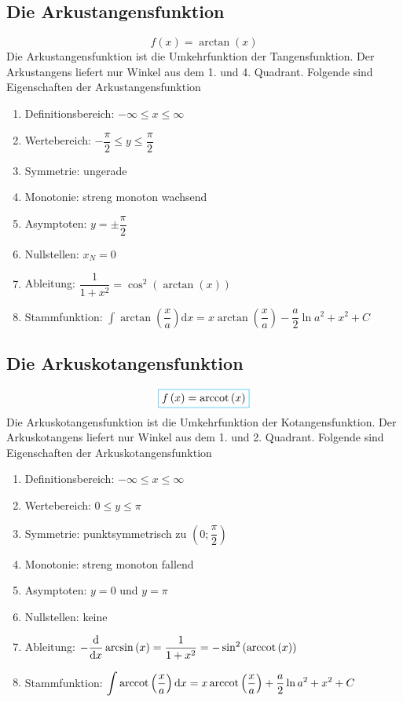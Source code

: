 \subsection{Die Arkustangensfunktion}
\begin{equation}
\boxed{f\left(x\right)=\arctan\left(x\right)}
\end{equation}
Die Arkustangensfunktion ist die Umkehrfunktion der Tangensfunktion. Der Arkustangens liefert nur Winkel aus dem 1. und 4. Quadrant. Folgende sind Eigenschaften der Arkustangensfunktion
\begin{enumerate}[$(a)$]
\item Definitionsbereich: $-\infty \leq x \leq \infty$
\item Wertebereich: $-\dfrac{\pi}{2}\leq y\leq \dfrac{\pi}{2}$
\item Symmetrie: ungerade
\item Monotonie: streng monoton wachsend
\item Asymptoten: $y=\pm\dfrac{\pi}{2}$ 
\item Nullstellen: $x_N=0$
\item Ableitung: $\dfrac{1}{1+x^2}=\cos^2\left(\arctan\left(x\right)\right)$
\item Stammfunktion: $\displaystyle \int \arctan\left(\dfrac{x}{a}\right)\text{d}x=x\arctan\left(\dfrac{x}{a}\right)-\dfrac{a}{2}\ln{a^2+x^2}+C$
\end{enumerate} 
\subsection{Die Arkuskotangensfunktion}
\begin{equation}
\boxed{f\left(x\right)=\arccot\left(x\right)}
\end{equation}
Die Arkuskotangensfunktion ist die Umkehrfunktion der Kotangensfunktion. Der Arkuskotangens liefert nur Winkel aus dem 1. und 2. Quadrant. Folgende sind Eigenschaften der Arkuskotangensfunktion
\begin{enumerate}[$(a)$]
\item Definitionsbereich: $-\infty \leq x \leq \infty$
\item Wertebereich: $0\leq y\leq \pi$
\item Symmetrie: punktsymmetrisch zu $\left(0; \dfrac{\pi}{2}\right)$
\item Monotonie: streng monoton fallend
\item Asymptoten: $y=0$ und $y=\pi$ 
\item Nullstellen: keine
\item Ableitung: $-\dfrac{\text{d}}{\text{d}x}\arcsin\left(x\right)=\dfrac{1}{1+x^2}=-\sin^2\left(\operatorname{arccot}\left(x\right)\right)$
\item Stammfunktion: $\displaystyle \int \operatorname{arccot}\left(\dfrac{x}{a}\right)\text{d}x=x\operatorname{arccot}\left(\dfrac{x}{a}\right)+\dfrac{a}{2}\ln{a^2+x^2}+C$
\end{enumerate} 

